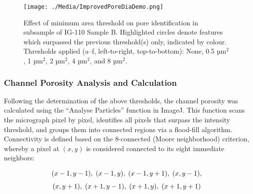 \documentclass[3p,twocolumn]{elsarticle}
\begin{document}
   \begin{table}
  \centering
  \caption{Effect of different pore area thresholds on IG-430F, showing the resulting pore count, total area, average pore size, and percentage area.}
  \label{tab:thresholdsandvariationsIG430F}
\end{table}

\begin{figure}[!htbp]
    \centering
    \texttt{[image: ./Media/ImprovedPoreDiaDemo.png]}
    \caption{Effect of minimum area threshold on pore identification in subsample of IG-110 Sample B. Highlighted circles denote features which surpassed the previous threshold(s) only, indicated by colour. Thresholds applied (a–f, left-to-right, top-to-bottom): None, 0.5 µm\(^2\), 1 µm\(^2\), 2 µm\(^2\), 4 µm\(^2\), and 8 µm\(^2\).}
    \label{fig:improvedporediademo}
\end{figure}

\subsubsection{Channel Porosity Analysis and Calculation}
Following the determination of the above thresholds, the channel porosity was
calculated using the “Analyse Particles” function in ImageJ. This function scans
the micrograph pixel by pixel, identifies all pixels that surpass the intensity
threshold, and groups them into connected regions via a flood-fill algorithm.
Connectivity is defined based on the 8-connected (Moore neighborhood) criterion,
whereby a pixel at $(x,y)$ is considered connected to its eight immediate
neighbors:

\begin{multline*}
\footnotesize
(x-1,y-1),\; (x-1,y),\; (x-1,y+1),\; (x,y-1),\\[4pt]
(x,y+1),\; (x+1,y-1),\; (x+1,y),\; (x+1,y+1)
\end{multline*}
\end{document}

